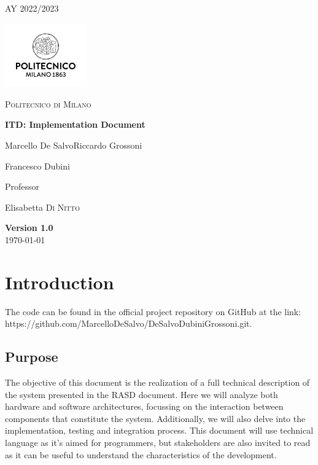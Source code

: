 \documentclass[table, 12pt]{article}
\begin{document}
\begin{titlepage}
    \centering
    {\scshape\large AY 2022/2023 \par}
    \vfill
    \includegraphics[width=100pt]{assets/logo_polimi.jpg}\par\vspace{1cm}
    {\scshape\LARGE Politecnico di Milano \par}
    \vspace{1.5cm}
    {\huge\bfseries ITD\@: Implementation Document \par}
    \vspace{2cm}
    {\Large {Marcello De Salvo\quad Riccardo Grossoni \par Francesco Dubini}\par}
    \vfill
    {\large Professor\par
        Elisabetta \textsc{Di Nitto}}
    \vfill
    {\large \textbf{Version 1.0}\\ \today \par}
\end{titlepage}


\thispagestyle{plain}
\mbox{}
\newpage
{}
\tableofcontents
\newpage
{}

\section{Introduction}
The code can be found in the official project repository on GitHub at the link:
https://github.com/MarcelloDeSalvo/DeSalvoDubiniGrossoni.git.

\subsection{Purpose}

The objective of this document is the realization of a full technical description of the system presented in the RASD document.
Here we will analyze both hardware and software architectures, focussing on the interaction between components that constitute the system.
Additionally, we will also delve into the implementation, testing and integration process.
This document will use technical language as it's aimed for programmers, but stakeholders are also invited to read as it can be useful to understand the characteristics of the development.
\end{document}

